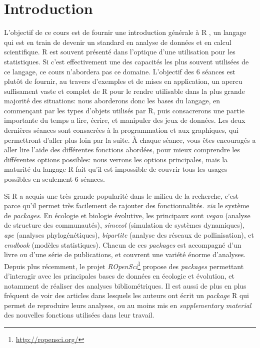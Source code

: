 \chapter{Introduction}

L'objectif de ce cours est de fournir une introduction générale à R \parencite{R-Development-Core-Team2008}, un langage qui est en train de devenir un standard en analyse de données et en calcul scientifique.
R est souvent présenté dans l'optique d'une utilisation pour les statistiques.
Si c'est effectivement une des capacités les plus souvent utilisées de ce langage, ce cours n'abordera pas ce domaine.
L'objectif des 6 séances est plutôt de fournir, au travers d'exemples et de mises en application, un apercu suffisament vaste et complet de R pour le rendre utilisable dans la plus grande majorité des situations:
nous aborderons donc les bases du langage, en commençant par les types d'objets utilisés par R, puis consacrerons une partie importante du temps a lire, écrire, et manipuler des jeux de données.
Les deux dernières séances sont consacrées à la programmation et aux graphiques, qui permettront d'aller plus loin par la suite.
À chaque séance, vous êtes encouragés a aller lire l'aide des différentes fonctions abordées, pour mieux comprendre les différentes options possibles: nous verrons les options principales, mais la maturité du langage R fait qu'il est impossible de couvrir tous les usages possibles en seulement 6 séances.

Si R a acquis une très grande popularité dans le milieu de la recherche, c'est parce qu'il permet très facilement de rajouter des fonctionnalités. \emph{via} le système de \emph{packages}.
En écologie et biologie évolutive, les principaux sont \emph{vegan} (analyse de structure des communautés), \emph{simecol} (simulation de systèmes dynamiques), \emph{ape} (analyses phylogénétiques), \emph{bipartite} (analyse des réseaux de pollinisation), et \emph{emdbook} (modèles statistiques).
Chacun de ces \emph{packages} est accompagné d'un livre ou d'une série de publications, et couvrent une variété énorme d'analyses.
Depuis plus récemment, le projet \emph{ROpenSci}\footnote{\url{http://ropensci.org/}} propose des \emph{packages} permettant d'interagir avec les principales bases de données en écologie et évolution, et notamment de réaliser des analyses bibliométriques.
Il est aussi de plus en plus fréquent de voir des articles dans lesquels les auteurs ont écrit un \emph{package} R qui permet de reproduire leurs analyses, ou au moins mis en \emph{supplementary material} des nouvelles fonctions utilisées dans leur travail.  

